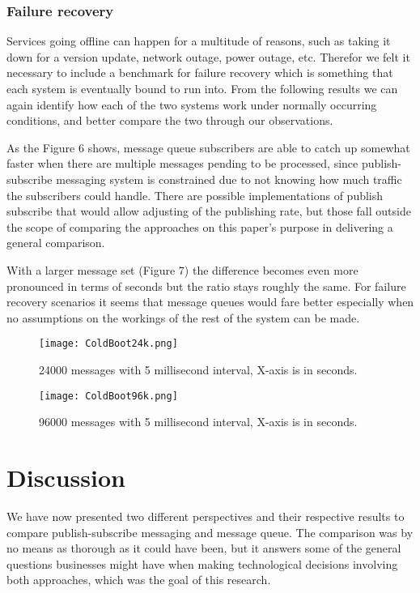 \documentclass[conference]{IEEEtran}
\begin{document}
\subsubsection{Failure recovery}
Services going offline can happen for a multitude of reasons, such as taking it down for a version update, network outage, power outage, etc. Therefor we felt it necessary to include a benchmark for failure recovery which is something that each system is eventually bound to run into. From the following results we can again identify how each of the two systems work under normally occurring conditions, and better compare the two through our observations.

As the Figure 6 shows, message queue subscribers are able to catch up somewhat faster when there are multiple messages pending to be processed, since publish-subscribe messaging system is constrained due to not knowing how much traffic the subscribers could handle. There are possible implementations of publish subscribe that would allow adjusting of the publishing rate, but those fall outside the scope of comparing the approaches on this paper's purpose in delivering a general comparison.

With a larger message set (Figure 7) the difference becomes even more pronounced in terms of seconds but the ratio stays roughly the same. For failure recovery scenarios it seems that message queues would fare better especially when no assumptions on the workings of the rest of the system can be made.

\begin{figure}[t]
    \centering
    \texttt{[image: ColdBoot24k.png]}
    \caption{24000 messages with 5 millisecond interval, X-axis is in seconds.}
\end{figure}

\begin{figure}[t]
    \centering
    \texttt{[image: ColdBoot96k.png]}
    \caption{96000 messages with 5 millisecond interval, X-axis is in seconds.}
\end{figure}

\section{Discussion}
We have now presented two different perspectives and their respective results to compare publish-subscribe messaging and message queue. The comparison was by no means as thorough as it could have been, but it answers some of the general questions businesses might have when making technological decisions involving both approaches, which was the goal of this research.
\end{document}
